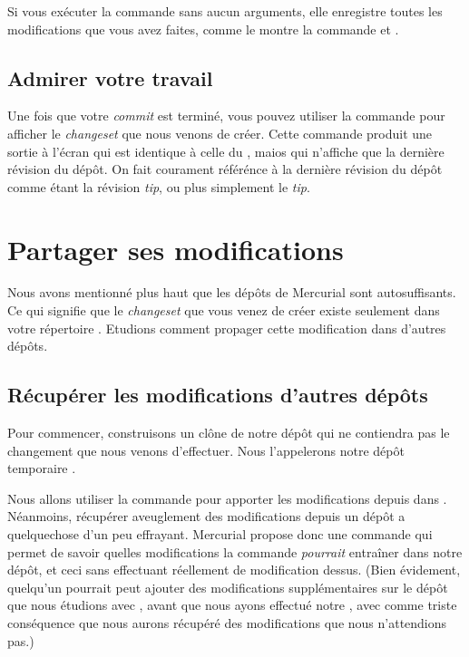 Si vous exécuter la commande  sans aucun arguments, elle
enregistre toutes les modifications que vous avez faites, comme le montre
la commande  et .

\subsection{Admirer votre travail}

Une fois que votre \textit{commit} est terminé, vous pouvez utiliser
la commande  pour afficher le \textit{changeset} que nous
venons de créer. Cette commande produit une sortie à l'écran qui est
identique à celle du , maios qui n'affiche que la dernière
révision du dépôt.
On fait courament référénce à la dernière révision du dépôt comme
étant la révision \textit{tip}, ou plus simplement le \textit{tip}.

\section{Partager ses modifications}

Nous avons mentionné plus haut que les dépôts de Mercurial 
sont autosuffisants. Ce qui signifie que le \textit{changeset} 
que vous venez de créer existe seulement dans votre répertoire 
. Etudions comment propager cette modification
dans d'autres dépôts.

\subsection{Récupérer les modifications d'autres dépôts}
\label{sec:tour:pull}

Pour commencer, construisons un clône de notre dépôt  
qui ne contiendra pas le changement que nous venons d'effectuer. Nous
l'appelerons notre dépôt temporaire .

Nous allons utiliser la commande  pour apporter les 
modifications depuis  dans .
Néanmoins, récupérer aveuglement des modifications depuis un dépôt
a quelquechose d'un peu effrayant. Mercurial propose donc une 
commande  qui permet de savoir quelles modifications
la commande  \emph{pourrait} entraîner dans notre dépôt,
et ceci sans effectuant réellement de modification dessus.
(Bien évidement, quelqu'un pourrait peut ajouter des modifications
supplémentaires sur le dépôt que nous étudions avec ,
avant que nous ayons effectué notre , avec comme 
triste conséquence que nous aurons récupéré des modifications que 
nous n'attendions pas.)

